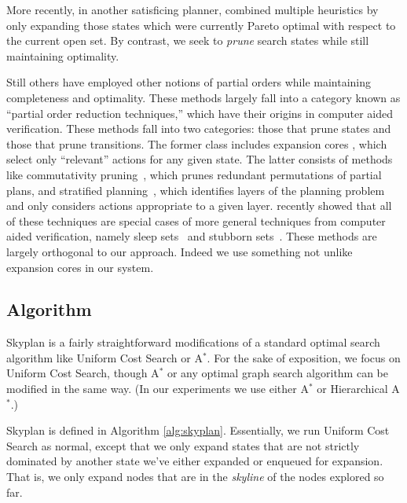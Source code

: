 \documentclass[letterpaper]{article}
\theoremstyle{plain} \newtheorem{theorem}{Theorem} \newtheorem{proposition}{Proposition} \newtheorem{lemma}{Lemma}
\theoremstyle{definition} \newtheorem{definition}{Definition} \newtheorem{conjecture}{Conjecture} \newtheorem*{example}{Example}
\theoremstyle{remark} \newtheorem*{remark}{Remark} \newtheorem*{note}{Note} \newtheorem{case}{Case}
\begin{document}
More recently, in another satisficing planner, \citet{roger2010more}
combined multiple heuristics by only expanding those states which
were currently Pareto optimal with respect to the current open set.
By contrast, we seek to \textit{prune} search states while still
maintaining optimality.

Still others have employed other notions of partial orders while
maintaining completeness and optimality. These methods largely fall
into a category known as ``partial order reduction techniques,''
which have their origins in computer aided verification. These
methods fall into two categories: those that prune states and those
that prune transitions.  The former class includes expansion cores
\cite{chen09completeness, xu11theory}, which select only ``relevant''
actions for any given state. The latter consists of methods like
commutativity pruning~\cite{geffner2000admissible}, which prunes
redundant permutations of partial plans, and stratified
planning~\cite{chen2009stratified}, which identifies layers of the
planning problem and only considers actions appropriate to a given
layer. \citet{wehrle2012partial} recently showed that all of these
techniques are special cases of more general techniques from computer
aided verification, namely sleep sets~\cite{godefroid96partial} and
stubborn sets~\cite{valmari92stubborn}. These methods are largely
orthogonal to our approach. Indeed we use something not unlike
expansion cores in our system.


\subsection{Algorithm}

Skyplan is a fairly straightforward modifications of a standard optimal search
algorithm like Uniform Cost
Search or A$^*$. For the sake of exposition, we focus on Uniform
Cost Search, though A$^*$ or any optimal graph search algorithm can
be modified in the same way. (In our experiments we use either A$^*$ or Hierarchical A$^*$.)

Skyplan is defined in Algorithm \ref{alg:skyplan}. Essentially, we
run Uniform Cost Search as normal, except that we only expand states
that are not strictly dominated by another state we've either
expanded or enqueued for expansion. That is, we only expand nodes
that are in the \textit{skyline} of the nodes explored so far.
\end{document}
